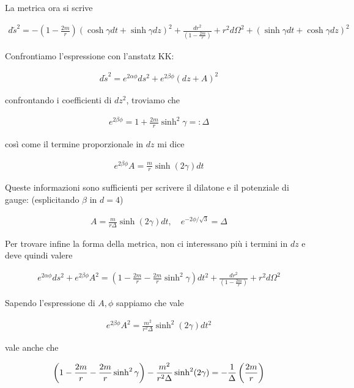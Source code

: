 \documentclass{report}
\begin{document}
La metrica ora si scrive 

\begin{align}
    d\tilde{s}^2 = -\left(1 - \frac{2m}{r} \right)(\cosh\gamma dt + \sinh\gamma dz)^2 + \frac{dr^2}{\left(1 - \frac{2m}{r} \right)} + r^2d\Omega^2 + (\sinh\gamma dt + \cosh\gamma dz)^2
\end{align}

Confrontiamo l'espressione con l'anstatz KK: 

\begin{align}
    d\tilde{s}^2 = e^{2\alpha\phi}ds^2 + e^{2\beta\phi}(dz + A)^2
\end{align}

confrontando i coefficienti di \(dz^2\), troviamo che 

\begin{align}
    e^{2\beta \phi} = 1 + \frac{2m}{r}\sinh^2\gamma =: \Delta
\end{align}

così come il termine proporzionale in \(dz\) mi dice 

\begin{align}
    e^{2\beta\phi}A = \frac{m}{r}\sinh(2\gamma)dt
\end{align}

Queste informazioni sono sufficienti per scrivere il dilatone e il potenziale di gauge: (esplicitando \(\beta\) in \(d=4\))

\begin{align}
    A = \frac{m}{r\Delta}\sinh(2\gamma)dt, \quad e^{-2\phi/\sqrt{3}} = \Delta
\end{align}

Per trovare infine la forma della metrica, non ci interessano più i termini in \(dz\) e deve quindi valere 

\begin{align}
    e^{2\alpha\phi}ds^2 + e^{2\beta\phi}A^2 = \left(1 - \frac{2m}{r} -\frac{2m}{r}\sinh^2\gamma\right)dt^2 + \frac{dr^2}{\left(1 - \frac{2m}{r} \right)} + r^2d\Omega^2
\end{align}

Sapendo l'espressione di \(A, \phi\) sappiamo che vale 

\begin{align}
    e^{2\beta\phi}A^2 = \frac{m^2}{r^2\Delta}\sinh^2(2\gamma)dt^2
\end{align}

vale anche che 

\begin{align}
    \left(1 - \frac{2m}{r} -\frac{2m}{r}\sinh^2\gamma\right) - \frac{m^2}{r^2\Delta}\sinh^2(2\gamma) = -\frac{1}{\Delta}\left(\-\frac{2m}{r} \right)
\end{align}
\end{document}
